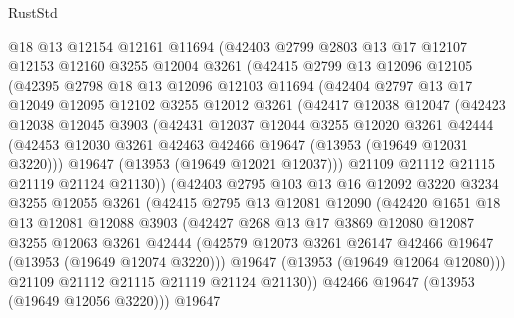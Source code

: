 \begin{lexlean}{RustStd}
\begin{coremodule}
      @18
      @13
      @12154
      @12161
      @11694
      (@42403
        @2799
        @2803
        @13
        @17
        @12107
        @12153
        @12160
        @3255
        @12004
        @3261
        (@42415
          @2799
          @13
          @12096
          @12105
          (@42395
            @2798
            @18
            @13
            @12096
            @12103
            @11694
            (@42404
              @2797
              @13
              @17
              @12049
              @12095
              @12102
              @3255
              @12012
              @3261
              (@42417
                @12038
                @12047
                (@42423
                  @12038
                  @12045
                  @3903
                  (@42431
                    @12037
                    @12044
                    @3255
                    @12020
                    @3261
                    @42444
                    (@42453 @12030 @3261 @42463 @42466 @19647 (@13953 (@19649 @12031 @3220)))
                    @19647
                    (@13953 (@19649 @12021 @12037)))
                  @21109
                  @21112
                  @21115
                  @21119
                  @21124
                  @21130))
              (@42403
                @2795
                @103
                @13
                @16
                @12092
                @3220
                @3234
                @3255
                @12055
                @3261
                (@42415
                  @2795
                  @13
                  @12081
                  @12090
                  (@42420
                    @1651
                    @18
                    @13
                    @12081
                    @12088
                    @3903
                    (@42427
                      @268
                      @13
                      @17
                      @3869
                      @12080
                      @12087
                      @3255
                      @12063
                      @3261
                      @42444
                      (@42579 @12073 @3261 @26147 @42466 @19647 (@13953 (@19649 @12074 @3220)))
                      @19647
                      (@13953 (@19649 @12064 @12080)))
                    @21109
                    @21112
                    @21115
                    @21119
                    @21124
                    @21130))
                @42466
                @19647
                (@13953 (@19649 @12056 @3220)))
              @19647

\end{coremodule}
\end{lexlean}
